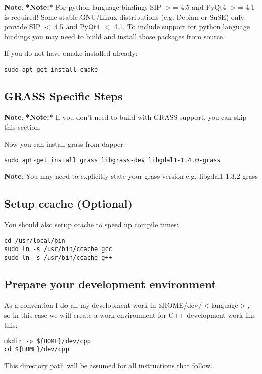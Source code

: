 \textbf{Note}:   \textbf{*Note:*} For python language bindings SIP $>$= 4.5 and PyQt4 $>$= 4.1 is required! Some stable GNU/Linux
distributions (e.g. Debian or SuSE) only provide SIP $<$ 4.5 and PyQt4 $<$ 4.1. To include support for python 
language bindings you may need to build and install those packages from source.

If you do not have cmake installed already:

\begin{verbatim}
sudo apt-get install cmake
\end{verbatim}

\subsection{GRASS Specific Steps}
\textbf{Note}:   \textbf{*Note:*} If you don't need to build with GRASS support,  you can
skip this section.

Now you can install grass from dapper:

\begin{verbatim}
sudo apt-get install grass libgrass-dev libgdal1-1.4.0-grass 
\end{verbatim}

\textbf{Note}:   You may need to explicitly state your grass version e.g. libgdal1-1.3.2-grass

\subsection{Setup ccache (Optional)}
You should also setup ccache to speed up compile times:

\begin{verbatim}
cd /usr/local/bin 
sudo ln -s /usr/bin/ccache gcc 
sudo ln -s /usr/bin/ccache g++ 
\end{verbatim}

\subsection{Prepare your development environment}
As a convention I do all my development work in \$HOME/dev/$<$language$>$, so in
this case we will create a work environment for C++ development work like
this:

\begin{verbatim}
mkdir -p ${HOME}/dev/cpp 
cd ${HOME}/dev/cpp 
\end{verbatim}

This directory path will be assumed for all instructions that follow.

